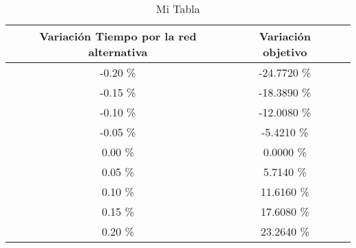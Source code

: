 \begin{table}
\centering
\begin{tabular}{|c|c|c|}
\hline
 Variación Tiempo por la red alternativa & Variación objetivo \\ \hline
-0.20 \% & -24.7720 \% \\ \hline
-0.15 \% & -18.3890 \% \\ \hline
-0.10 \% & -12.0080 \% \\ \hline
-0.05 \% & -5.4210 \% \\ \hline
0.00 \% & 0.0000 \% \\ \hline
0.05 \% & 5.7140 \% \\ \hline
0.10 \% & 11.6160 \% \\ \hline
0.15 \% & 17.6080 \% \\ \hline
0.20 \% & 23.2640 \% \\ \hline
\end{tabular}
\caption{Mi Tabla}
\end{table}
